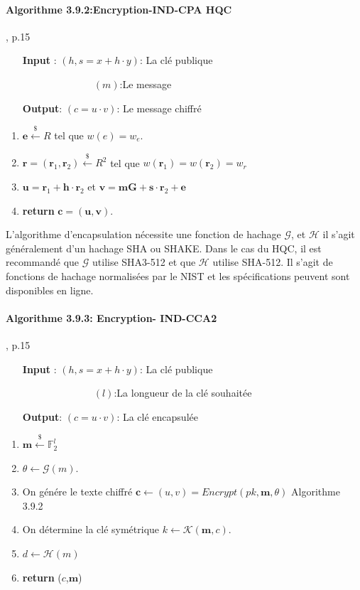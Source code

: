 \documentclass[12pt,openany]{report}
\begin{document}
\paragraph{Algorithme 3.9.2:Encryption-IND-CPA HQC \\}\cite{melchor2020}, p.15

\begin{itemize}
\item[\textbf{Input} :]$ (h,s=x+h\cdot y)$: La clé publique
\item[]       $\hspace{3cm}(m)$:Le message
\item[ \textbf{Output}:]$( c=u\cdot v  ) $: Le message chiffré
\end{itemize}
\begin{enumerate}
\item $\mathbf{e}\overset{\$}{\gets}\mathit{R}$ tel que $w(e)=w_e$.
\item $ \mathbf{r}=(\mathbf{r}_1,\mathbf{r}_2)\overset{\$}{\gets}\mathit{R}^2$ tel que $w(\mathbf{r}_1)=w(\mathbf{r}_2)=w_r$
\item $\mathbf{u}=\mathbf{r}_1+\mathbf{h}\cdot\mathbf{r}_2$ et $ \mathbf{v}= \mathbf{mG}+\mathbf{s}\cdot \mathbf{r}_2+\mathbf{e}$
\item \textbf{return} $\mathbf{c=(u,v)}$.
\end{enumerate}
L'algorithme d'encapsulation nécessite une fonction de hachage $\mathcal{G}$, et $\mathcal{H} $  il s'agit généralement d'un hachage SHA ou SHAKE. Dans le cas du HQC, il est recommandé que $\mathcal{G}$ utilise SHA3-512
et que $\mathcal{H}$ utilise SHA-512. Il s'agit de fonctions de hachage normalisées par le NIST et les spécifications peuvent sont disponibles en ligne.

\paragraph{Algorithme 3.9.3: Encryption- IND-CCA2 \\}\cite{melchor2020}, p.15

\begin{itemize}
\item[\textbf{Input} :]$ (h,s=x+h\cdot y)$: La clé publique
\item[]       $\hspace{3cm}(l)$:La longueur de la clé souhaitée
\item[ \textbf{Output}:]$( c=u\cdot v  ) $: La clé encapsulée
\end{itemize}
\begin{enumerate}
\item $\mathbf{m} \overset{\$}{\gets}\mathbb{F}_2^{l}  $
\item $ \theta \gets \mathcal{G}(m).$
\item On génére le texte chiffré $\mathbf{c}\gets (u,v)=Encrypt(pk,\mathbf{m},\theta)$ \Comment Algorithme 3.9.2
\item On détermine la clé symétrique $k \gets \mathcal{K}(\mathbf{m},c).$
\item $d\gets \mathcal{H}(m)$
\item \textbf{return} ($c$,$\mathbf{m}$)
\end{enumerate}
\end{document}
